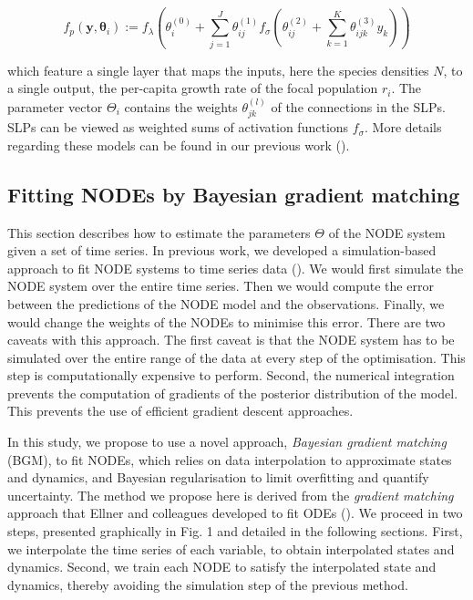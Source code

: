 \documentclass[11pt, oneside]{article}
\begin{document}
\vspace{-0.5cm}
\begin{equation}
    f_p \left(\mathbf{y}, \mathbf{\theta}_i \right) := f_\lambda \left( \theta_i^{(0)} + \sum_{j=1}^{J} \theta^{(1)}_{ij} f_\sigma \left( \theta^{(2)}_{ij} + \sum_{k=1}^{K} \theta^{(3)}_{ijk} y_k \right) \right)
\end{equation}

which feature a single layer that  maps the inputs, here the species densities $N$, to a single output, the per-capita growth rate of the focal population $r_i$.
The parameter vector $\Theta_i$ contains the weights $\theta^{(l)}_{jk}$ of the connections in the SLPs.
SLPs can be viewed as weighted sums of activation functions $f_\sigma$.
More details regarding these models can be found in our previous work (\cite{Bonnaffe2021a}).

\subsection{Fitting NODEs by Bayesian gradient matching}

This section describes how to estimate the parameters $\Theta$ of the NODE system given a set of time series.
In previous work, we developed a simulation-based approach to fit NODE systems to time series data (\cite{Bonnaffe2021a}).
We would first simulate the NODE system over the entire time series.
Then we would compute the error between the predictions of the NODE model and the observations. 
Finally, we would change the weights of the NODEs to minimise this error. 
There are two caveats with this approach.
The first caveat is that the NODE system has to be simulated over the entire range of the data at every step of the optimisation.
This step is computationally expensive to perform.
Second, the numerical integration prevents the computation of gradients of the posterior distribution of the model.
This prevents the use of efficient gradient descent approaches.

In this study, we propose to use a novel approach, \textit{Bayesian gradient matching} (BGM), to fit NODEs, which relies on data interpolation to approximate states and dynamics, and Bayesian regularisation to limit overfitting and quantify uncertainty.
The method we propose here is derived from the \textit{gradient matching} approach that Ellner and colleagues developed to fit ODEs (\cite{Ellner2002, Wu2005}).
We proceed in two steps, presented graphically in Fig. 1 and detailed in the following sections. 
First, we interpolate the time series of each variable, to obtain interpolated states and dynamics. 
Second, we train each NODE to satisfy the interpolated state and dynamics, thereby avoiding the simulation step of the previous method. 
\end{document}

